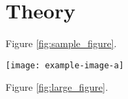 \documentclass[9pt]{AEGC2021}
\begin{document}
\setlength{\columnsep}{1cm}
\begin{multicols}{2}


\shortAbstract
{
\blindtext[3]
}

\section{Theory}%
\blindtext
Figure \ref{fig:sample_figure}.

\blindtext

\begin{figurehere}
 \centering
 \captionsetup{type=figure}
 \texttt{[image: example-image-a]}
 \label{fig:sample_figure}
\end{figurehere}

\blindtext Figure \ref{fig:large_figure}.


\blindtext
\cite{CitekeyArticle, CitekeyBook, CitekeyMastersthesis}

\end{multicols}
\restoregeometry
\setlength{\columnsep}{1cm}
\end{document}

